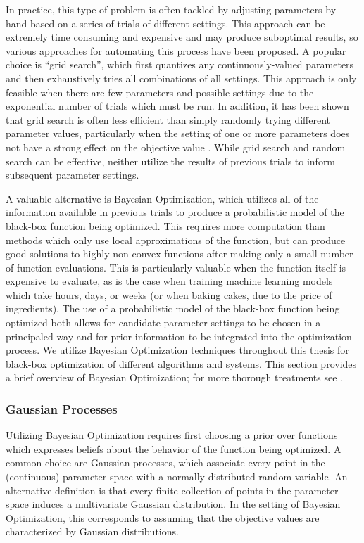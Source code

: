 In practice, this type of problem is often tackled by adjusting parameters by hand based on a series of trials of different settings.
This approach can be extremely time consuming and expensive and may produce suboptimal results, so various approaches for automating this process have been proposed.
A popular choice is ``grid search'', which first quantizes any continuously-valued parameters and then exhaustively tries all combinations of all settings.
This approach is only feasible when there are few parameters and possible settings due to the exponential number of trials which must be run.
In addition, it has been shown that grid search is often less efficient than simply randomly trying different parameter values, particularly when the setting of one or more parameters does not have a strong effect on the objective value \cite{}.
While grid search and random search can be effective, neither utilize the results of previous trials to inform subsequent parameter settings.

A valuable alternative is Bayesian Optimization, which utilizes all of the information available in previous trials to produce a probabilistic model of the black-box function being optimized.
This requires more computation than methods which only use local approximations of the function, but can produce good solutions to highly non-convex functions after making only a small number of function evaluations.
This is particularly valuable when the function itself is expensive to evaluate, as is the case when training machine learning models which take hours, days, or weeks (or when baking cakes, due to the price of ingredients).
The use of a probabilistic model of the black-box function being optimized both allows for candidate parameter settings to be chosen in a principaled way and for prior information to be integrated into the optimization process.
We utilize Bayesian Optimization techniques throughout this thesis for black-box optimization of different algorithms and systems.
This section provides a brief overview of Bayesian Optimization; for more thorough treatments see \cite{}.

\subsubsection{Gaussian Processes}

Utilizing Bayesian Optimization requires first choosing a prior over functions which expresses beliefs about the behavior of the function being optimized.
A common choice are Gaussian processes, which associate every point in the (continuous) parameter space with a normally distributed random variable.
An alternative definition is that every finite collection of points in the parameter space induces a multivariate Gaussian distribution.
In the setting of Bayesian Optimization, this corresponds to assuming that the objective values are characterized by Gaussian distributions.

